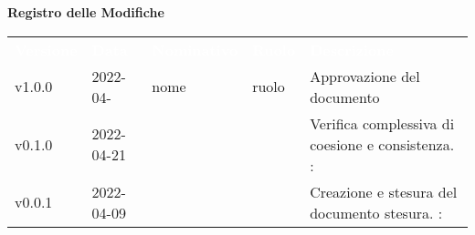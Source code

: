 

{\LARGE{\textbf{Registro delle Modifiche}}} \\
\begin{table}[!htbp]
\renewcommand{\arraystretch}{1.5}
\begin{tabular}{ m{}<{\centering}  m{}<{\centering}  m{}<{\centering}  m{}<{\centering}  m{}<{\centering} }
	\rowcolor{darkblue}
	\textcolor{white}{\textbf{Versione}} &\textcolor{white}{\textbf{Data}}& \textcolor{white}{\textbf{Nominativo}} & \textcolor{white}{\textbf{Ruolo}}&\textcolor{white}{\textbf{Descrizione}}\\ 

	v1.0.0 & 2022-04- & nome & ruolo & Approvazione del documento \\

	v0.1.0& 2022-04-21 & \PV & \AN & Verifica complessiva di coesione e consistenza.  \VE: \textit{\GC}\\

	v0.0.1& 2022-04-09 & \PV & \AN &Creazione e stesura del documento stesura.  \VE: \textit{\GC}\\

\end{tabular}
\end{table}

\pagebreak